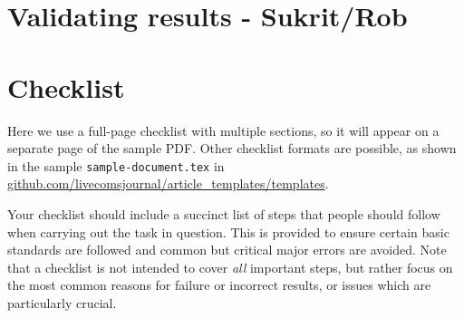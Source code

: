 \documentclass[9pt,bestpractices]{livecoms}
\begin{document}
\section{Validating results - Sukrit/Rob}

\section{Checklist}
Here we use a full-page checklist with multiple sections, so it will appear on a separate page of the sample PDF.
Other checklist formats are possible, as shown in the sample \texttt{sample-document.tex} in \url{github.com/livecomsjournal/article_templates/templates}.

Your checklist should include a succinct list of steps that people should follow when carrying out the task in question.
This is provided to ensure certain basic standards are followed and common but critical major errors are avoided.
Note that a checklist is not intended to cover \emph{all} important steps, but rather focus on the most common reasons for failure or incorrect results, or issues which are particularly crucial.
\end{document}
